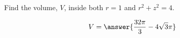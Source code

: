 \documentclass{ximera}
\author{David Guichard \and Neal Koblitz \and H. Jerome Keisler \and Albert Scheller \and Barry Balof \and Mike Wills \and Matthew Carr}
\begin{document}
\begin{exercise}





Find the volume, $V$, inside both $r=1$ and $r^2+z^2=4$.
\begin{prompt}
\[
V=\answer{\frac{32\pi}{3}-4\sqrt{3}\pi}
\]
\end{prompt}



\end{exercise}
\end{document}
